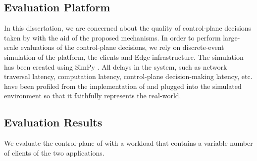 \subsection{Evaluation Platform}
In this dissertation, we are concerned about the quality of control-plane decisions taken by \oneedge{} with the aid of the proposed mechanisms. In order to perform large-scale evaluations of the control-plane decisions, we rely on discrete-event simulation of the \oneedge{} platform, the clients and Edge infrastructure. The simulation has been created using SimPy \cite{simpy}. All delays in the system, such as network traversal latency, computation latency, control-plane decision-making latency, etc. have been profiled from the implementation of \oneedge{} and plugged into the simulated environment so that it faithfully represents the real-world.

\subsection{Evaluation Results}

We evaluate the control-plane of \oneedge{} with a workload that contains a variable number of clients of the two applications. 

